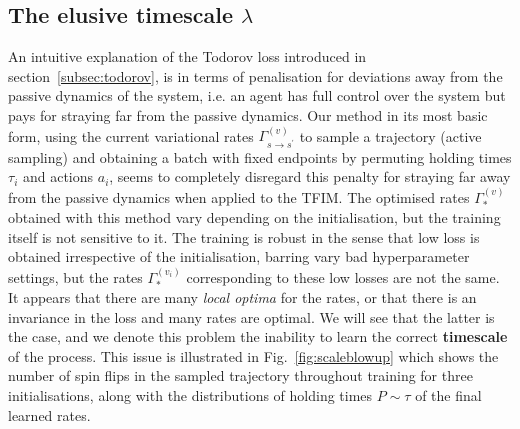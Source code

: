 \subsection{The elusive timescale $\lambda$}
An intuitive explanation of the Todorov loss introduced in section~\ref{subsec:todorov}, is in terms of penalisation for deviations away from the passive dynamics of the system, i.e. an agent has full control over the system but pays for straying far from the passive dynamics. Our method in its most basic form, using the current variational rates $\Gamma^{(v)}_{s \rightarrow s^\prime}$ to sample a trajectory (active sampling) and obtaining a batch with fixed endpoints by permuting holding times $\tau_i$ and actions $a_i$, seems to completely disregard this penalty for straying far away from the passive dynamics when applied to the TFIM. The optimised rates $\Gamma_*^{(v)}$ obtained with this method vary depending on the initialisation, but the training itself is not sensitive to it. The training is robust in the sense that low loss is obtained irrespective of the initialisation, barring vary bad hyperparameter settings, but the rates $\Gamma_*^{(v_i)}$ corresponding to these low losses are not the same. It appears that there are many \emph{local optima} for the rates, or that there is an invariance in the loss and many rates are optimal. We will see that the latter is the case, and we denote this problem the inability to learn the correct \textbf{timescale} of the process. This issue is illustrated in Fig.~\ref{fig:scaleblowup} which shows the number of spin flips in the sampled trajectory throughout training for three initialisations, along with the distributions of holding times $P \sim \tau$ of the final learned rates. 
